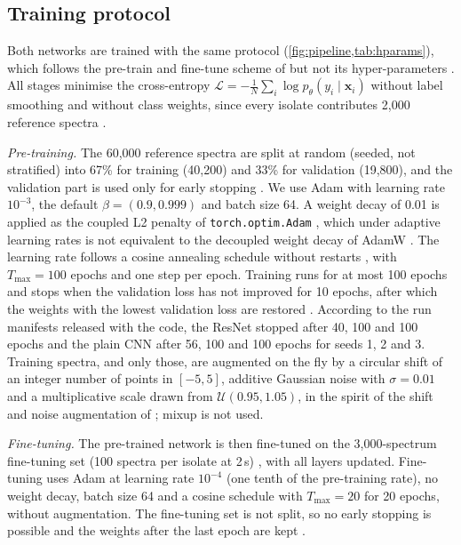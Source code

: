 \documentclass[journal,onecolumn]{IEEEtran}
\newcommand{\sunit}[1]{#1\,s}             %
\begin{document}
\subsection{Training protocol}
\label{sec:models-training}
Both networks are trained with the same protocol (\cref{fig:pipeline,tab:hparams}),
which follows the pre-train and fine-tune scheme of \cite{ho2019rapid} but
not its hyper-parameters \cite{ho2019bacteriaid}. All stages minimise the
cross-entropy
$\mathcal{L} = -\frac{1}{N}\sum_{i}\log p_\theta(y_i\mid\mathbf{x}_i)$
without label smoothing \cite{szegedy2016rethinking} and without class
weights, since every isolate contributes 2{,}000 reference spectra
\cite{ho2019rapid}.

\emph{Pre-training.} The 60{,}000 reference spectra \cite{ho2019rapid} are
split at random (seeded, not stratified) into 67\% for training (40{,}200)
and 33\% for validation (19{,}800), and the validation part is used only
for early stopping \cite{prechelt1998early}. We use Adam
\cite{kingma2015adam} with learning rate $10^{-3}$, the default
$\beta=(0.9,0.999)$ and batch size 64. A weight decay of 0.01 is applied as
the coupled L2 penalty of \texttt{torch.optim.Adam}
\cite{paszke2019pytorch}, which under adaptive learning rates is not
equivalent to the decoupled weight decay of AdamW
\cite{loshchilov2019decoupled}. The learning rate follows a cosine
annealing schedule without restarts \cite{loshchilov2017sgdr}, with
$T_{\max}=100$ epochs and one step per epoch. Training runs for at most 100
epochs and stops when the validation loss has not improved for 10 epochs,
after which the weights with the lowest validation loss are restored
\cite{prechelt1998early}. According to the run manifests released with the
code, the ResNet stopped after 40, 100 and 100 epochs and the plain CNN
after 56, 100 and 100 epochs for seeds 1, 2 and 3. Training spectra, and only those, are augmented
on the fly by a circular shift of an integer number of points in
$[-5,5]$, additive Gaussian noise with $\sigma=0.01$ and a multiplicative
scale drawn from $\mathcal{U}(0.95,1.05)$, in the spirit of the shift and
noise augmentation of \cite{liu2017deep}; mixup \cite{zhang2018mixup} is
not used.

\emph{Fine-tuning.} The pre-trained network is then fine-tuned on the
3{,}000-spectrum fine-tuning set (100 spectra per isolate at \sunit{2})
\cite{ho2019rapid}, with all layers updated. Fine-tuning uses Adam
\cite{kingma2015adam} at learning rate $10^{-4}$ (one tenth of the
pre-training rate), no weight decay, batch size 64 and a cosine schedule
with $T_{\max}=20$ \cite{loshchilov2017sgdr} for 20 epochs, without
augmentation. The fine-tuning set is not split, so no early stopping is
possible and the weights after the last epoch are kept
\cite{prechelt1998early}.
\end{document}
